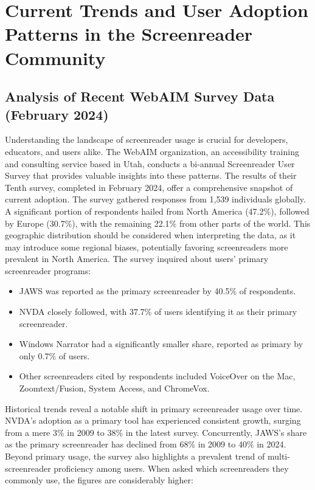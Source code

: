 \section{Current Trends and User Adoption Patterns in the Screenreader Community}

\subsection{Analysis of Recent WebAIM Survey Data (February 2024)}
Understanding the landscape of screenreader usage is crucial for developers, educators, and users alike. The WebAIM organization, an accessibility training and consulting service based in Utah, conducts a bi-annual Screenreader User Survey that provides valuable insights into these patterns.\supercite{kingsbury2025} The results of their Tenth survey, completed in February 2024, offer a comprehensive snapshot of current adoption.
The survey gathered responses from 1,539 individuals globally. A significant portion of respondents hailed from North America (47.2\%), followed by Europe (30.7\%), with the remaining 22.1\% from other parts of the world.\supercite{kingsbury2025} This geographic distribution should be considered when interpreting the data, as it may introduce some regional biases, potentially favoring screenreaders more prevalent in North America.\supercite{kingsbury2025}
The survey inquired about users' primary screenreader programs:
\begin{itemize}
	\item JAWS was reported as the primary screenreader by 40.5\% of respondents.\supercite{kingsbury2025}
	\item NVDA closely followed, with 37.7\% of users identifying it as their primary screenreader.\supercite{kingsbury2025}
	\item Windows Narrator had a significantly smaller share, reported as primary by only 0.7\% of users.\supercite{kingsbury2025}
	\item Other screenreaders cited by respondents included VoiceOver on the Mac, Zoomtext/Fusion, System Access, and ChromeVox.\supercite{kingsbury2025}
\end{itemize}
Historical trends reveal a notable shift in primary screenreader usage over time. NVDA's adoption as a primary tool has experienced consistent growth, surging from a mere 3\% in 2009 to 38\% in the latest survey. Concurrently, JAWS's share as the primary screenreader has declined from 68\% in 2009 to 40\% in 2024.\supercite{kingsbury2025}
Beyond primary usage, the survey also highlights a prevalent trend of multi-screenreader proficiency among users. When asked which screenreaders they commonly use, the figures are considerably higher:
